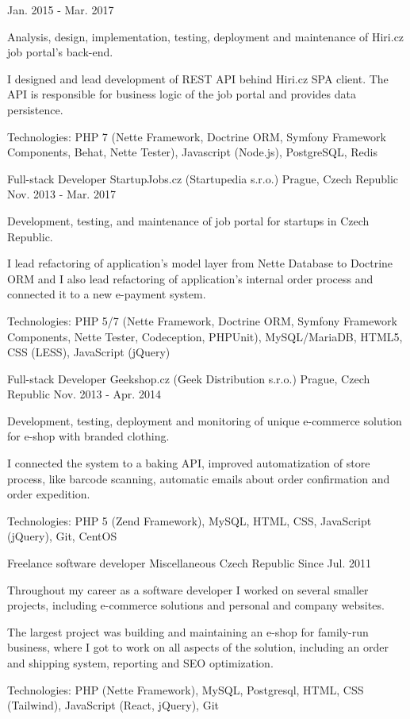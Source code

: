 \begin{cventries}
    {Jan. 2015 - Mar. 2017}
    {
      \begin{cvitems}
        \item {Analysis, design, implementation, testing, deployment and maintenance of Hiri.cz job portal's back-end.}
        \item {I designed and lead development of REST API behind Hiri.cz SPA client. The API is responsible for business logic of the job portal and provides data persistence.}
        \item {Technologies: PHP 7 (Nette Framework, Doctrine ORM, Symfony Framework Components, Behat, Nette Tester), Javascript (Node.js), PostgreSQL, Redis}
      \end{cvitems}
    }
  \cventry
    {Full-stack Developer}
    {StartupJobs.cz (Startupedia s.r.o.)}
    {Prague, Czech Republic}
    {Nov. 2013 - Mar. 2017}
    {
      \begin{cvitems}
        \item {Development, testing, and maintenance of job portal for startups in Czech Republic.}
        \item {I lead refactoring of application's model layer from Nette Database to Doctrine ORM and I also lead refactoring of application's internal order process and connected it to a new e-payment system.}
        \item {Technologies: PHP 5/7 (Nette Framework, Doctrine ORM, Symfony Framework Components, Nette Tester, Codeception, PHPUnit), MySQL/MariaDB, HTML5, CSS (LESS), JavaScript (jQuery)}
      \end{cvitems}
    }
  \cventry
    {Full-stack Developer}
    {Geekshop.cz (Geek Distribution s.r.o.)}
    {Prague, Czech Republic}
    {Nov. 2013 - Apr. 2014}
    {
      \begin{cvitems}
        \item {Development, testing, deployment and monitoring of unique e-commerce solution for e-shop with branded clothing.}
        \item {I connected the system to a baking API, improved automatization of store process, like barcode scanning, automatic emails about order confirmation and order expedition.}
        \item {Technologies: PHP 5 (Zend Framework), MySQL, HTML, CSS, JavaScript (jQuery), Git, CentOS}
      \end{cvitems}
    }
  \cventry
    {Freelance software developer}
    {Miscellaneous}
    {Czech Republic}
    {Since Jul. 2011}
    {
      \begin{cvitems}
        \item {Throughout my career as a software developer I worked on several smaller projects, including e-commerce solutions and personal and company websites.}
        \item {The largest project was building and maintaining an e-shop for family-run business, where I got to work on all aspects of the solution, including an order and shipping system, reporting and SEO optimization.}
        \item {Technologies: PHP (Nette Framework), MySQL, Postgresql, HTML, CSS (Tailwind), JavaScript (React, jQuery), Git}
      \end{cvitems}
    }
\end{cventries}
